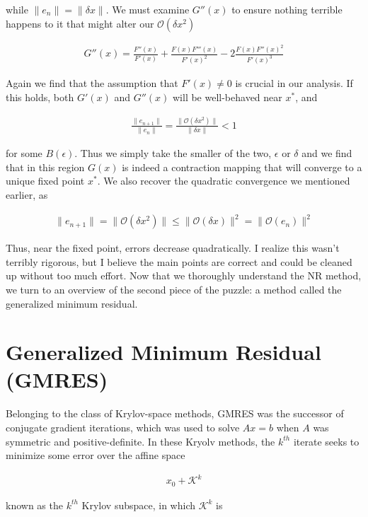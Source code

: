 \documentclass[11pt]{article}
\begin{document}
while $\| e_n \| = \| \delta x \|$.  We must examine $G''(x)$ to ensure nothing terrible happens to it that might alter our $\mathcal{O}(\delta x^2)$

\begin{align*}
  G''(x) = \frac{F''(x)}{F'(x)} + \frac{F(x)F'''(x)}{F'(x)^2} - 2 \frac{F(x)F''(x)^2}{F'(x)^3}
\end{align*}

Again we find that the assumption that $F'(x) \neq 0$ is crucial in our analysis. If this holds, both $G'(x)$ and $G''(x)$ will be well-behaved near $x^*$, and 

\begin{align*}
  \frac{\| e_{n+1} \|}{\| e_{n} \|} = \frac{\| \mathcal{O}(\delta x^2) \|}{\| \delta x \|} < 1
\end{align*}
 
for some $B(\epsilon)$. Thus we simply take the smaller of the two, $\epsilon$ or $\delta$ and we find that in this region $G(x)$ is indeed a contraction mapping that will converge to a unique fixed point $x^*$. We also recover the quadratic convergence we mentioned earlier, as

\begin{align*}
  \| e_{n+1} \| = \| \mathcal{O}(\delta x^2) \| \leq \| \mathcal{O}(\delta x) \|^2 = \| \mathcal{O}(e_n) \|^2
\end{align*}

Thus, near the fixed point, errors decrease quadratically. I realize this wasn't terribly rigorous, but I believe the main points are correct and could be cleaned up without too much effort. Now that we thoroughly understand the NR method, we turn to an overview of the second piece of the puzzle: a method called the generalized minimum residual.

\section{Generalized Minimum Residual (GMRES)}

Belonging to the class of Krylov-space methods, GMRES was the successor of conjugate gradient iterations, which was used to solve $Ax=b$ when $A$ was symmetric and positive-definite. In these Kryolv methods, the $k^{th}$ iterate seeks to minimize some error over the affine space

\begin{align*}
  x_0 + \mathcal{K}^k
\end{align*}

known as the $k^{th}$ Krylov subspace, in which $\mathcal{K}^k$ is
\end{document}
